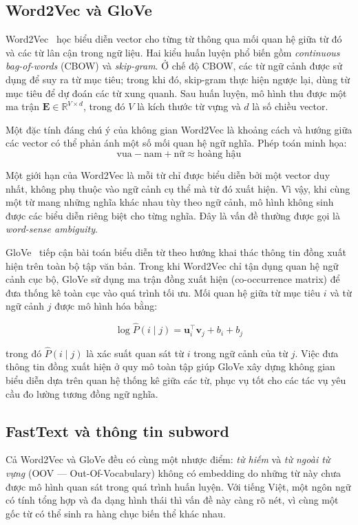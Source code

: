 \subsection{Word2Vec và GloVe}

Word2Vec~\cite{mikolov2013word2vec} học biểu diễn vector cho từng từ thông qua mối quan hệ giữa từ đó và các từ lân cận trong ngữ liệu. Hai kiểu huấn luyện phổ biến gồm \textit{continuous bag-of-words} (CBOW) và \textit{skip-gram}. Ở chế độ CBOW, các từ ngữ cảnh được sử dụng để suy ra từ mục tiêu; trong khi đó, skip-gram thực hiện ngược lại, dùng từ mục tiêu để dự đoán các từ xung quanh. Sau huấn luyện, mô hình thu được một ma trận $\mathbf{E} \in \mathbb{R}^{V \times d}$, trong đó $V$ là kích thước từ vựng và $d$ là số chiều vector.

Một đặc tính đáng chú ý của không gian Word2Vec là khoảng cách và hướng giữa các vector có thể phản ánh một số mối quan hệ ngữ nghĩa. Phép toán minh họa:
\[
\text{vua} - \text{nam} + \text{nữ} \approx \text{hoàng hậu}
\]

Một giới hạn của Word2Vec là mỗi từ chỉ được biểu diễn bởi một vector duy nhất, không phụ thuộc vào ngữ cảnh cụ thể mà từ đó xuất hiện. Vì vậy, khi cùng một từ mang những nghĩa khác nhau tùy theo ngữ cảnh, mô hình không sinh được các biểu diễn riêng biệt cho từng nghĩa. Đây là vấn đề thường được gọi là \textit{word-sense ambiguity}.

GloVe~\cite{pennington2014glove} tiếp cận bài toán biểu diễn từ theo hướng khai thác thông tin đồng xuất hiện trên toàn bộ tập văn bản. Trong khi Word2Vec chỉ tận dụng quan hệ ngữ cảnh cục bộ, GloVe sử dụng ma trận đồng xuất hiện (co-occurrence matrix) để đưa thống kê toàn cục vào quá trình tối ưu. Mối quan hệ giữa từ mục tiêu $i$ và từ ngữ cảnh $j$ được mô hình hóa bằng:

\[
\log \hat{P}(i \mid j) = \mathbf{u}_i^\top \mathbf{v}_j + b_i + b_j
\]

trong đó $\hat{P}(i \mid j)$ là xác suất quan sát từ $i$ trong ngữ cảnh của từ $j$. Việc đưa thông tin đồng xuất hiện ở quy mô toàn tập giúp GloVe xây dựng không gian biểu diễn dựa trên quan hệ thống kê giữa các từ, phục vụ tốt cho các tác vụ yêu cầu đo lường tương đồng ngữ nghĩa.

\subsection{FastText và thông tin subword}

Cả Word2Vec và GloVe đều có cùng một nhược điểm: \textit{từ hiếm} và \textit{từ ngoài từ vựng} (OOV --- Out-Of-Vocabulary) không có embedding do những từ này chưa được mô hình quan sát trong quá trình huấn luyện. Với tiếng Việt, một ngôn ngữ có tính tổng hợp và đa dạng hình thái thì vấn đề này càng rõ nét, vì cùng một gốc từ có thể sinh ra hàng chục biến thể khác nhau.

